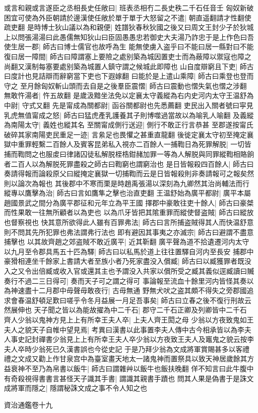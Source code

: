 或言和親或言遂臣之丞相長史任敞曰|{
	班表丞相冇二長史秩二千石任音壬}
匈奴新破困宜可使為外臣朝請於邊漢使任敞於單于單于大怒留之不遣|{
	朝直遥翻請才性翻使疏吏翻}
是時博士狄山議以為和親便|{
	姓譜狄春秋狄國之後又曰周文王封少子於狄城}
上以問張湯湯曰此愚儒無知狄山曰臣固愚愚忠若御史大夫湯乃詐忠于是上作色曰吾使生居一郡|{
	師古曰博士儒官也故呼為生}
能無使虜入盗乎曰不能曰居一縣對曰不能復曰居一障間|{
	師古曰障謂塞上要險之處别築為城因置吏士而為蔽障以禦寇也障之尚翻又漢制每塞要處别築為城置人鎮守謂之候城此即障也}
山自度辯窮且下吏|{
	師古曰度計也見詰辯而辭窮當下吏也下遐嫁翻}
曰能於是上遣山乘障|{
	師古曰乘登也登而守之}
至月餘匈奴斬山頭而去自是之後羣臣震慴|{
	師古曰震動也慴失氣也慴之涉翻}
無敢忤湯者|{
	忤五故翻}
是歲汲黯坐法免以定襄太守義縱為右内史河内太守王温舒為中尉|{
	守式又翻}
先是甯成為關都尉|{
	函谷關都尉也先悉薦翻}
吏民出入關者號曰寜見乳虎無值甯成之怒|{
	師古曰猛虎產乳護養其子則博噬過當故以為喻乳人喻翻}
及義縱為南陽太守|{
	義姓也縱其名}
至關甯成側行送迎|{
	側行不敢正行言恭甚}
至郡遂按甯氏破碎其家南陽吏民重足一迹|{
	言絫足也畏懼之甚重直龍翻}
後徙定襄太守初至掩定襄獄中重罪輕繫二百餘人及賓客昆弟私入視亦二百餘人一捕鞫日為死罪解脱|{
	一切皆捕而鞫問之也服䖍曰律諸囚徒私解脱桎梏鉗赭加罪一等為人解脱與同罪縱鞫相賂餉者二百人以為解脱死罪盡殺之師古曰鞫窮也謂窮治也}
是日皆報殺四百餘人|{
	師古曰奏請得報而論殺原父曰縱掩定襄獄一切捕鞫而云是日皆報殺則非奏請報可之報矣然則以論次為報也}
其後郡中不寒而栗是時趙禹張湯以深刻為九卿然其治尚輔法而行縱專以鷹擊為治|{
	師古曰言如鷹隼之擊也治直吏翻}
王温舒始為廣平都尉|{
	廣平本屬趙國景武之間分為廣平郡征和元年立為平王國}
擇郡中豪敢往吏十餘人|{
	師古曰豪桀而性果敢一往無所顧者以為吏也}
以為爪牙皆把其隂重罪而縱使督盗賊|{
	師古曰縱放也督察視也}
快其意所欲得此人雖有百罪弗法|{
	師古曰言所捕盗賊得其人而快温舒意則不問其先所犯罪也弗法謂弗行法也}
即有避因其事夷之亦滅宗|{
	師古曰避謂不盡意捕擊也}
以其故齊趙之郊盗賊不敢近廣平|{
	近其靳翻}
廣平聲為道不拾遺遷河内太守以九月至令郡具馬五十匹為驛|{
	師古曰以私馬於道上往往置驛自河内至長安}
捕郡中豪猾相連坐千餘家上書請大者至族小者乃死家盡没入償臧|{
	師古曰以臧獲罪者既没入之又令出倍臧或收入官或還其主也予謂没入共家以償所受之臧其義似逕臧讀曰贓}
奏行不過二三日得可|{
	奏而天子可之謂之得可}
事論報至流血十餘里河内皆怪其奏以為神速盡十二月郡中毋聲毋敢夜行|{
	古毋無通}
野無犬吠之盗其頗不得失之旁郡國追求會春温舒頓足歎曰嗟乎令冬月益展一月足吾事矣|{
	師古曰立春之後不復行刑故云然展伸也}
天子聞之皆以為能故擢為中二千石|{
	郡守二千石正卿及列卿皆中二千石}
齊人少翁以鬼神方見上上有所幸王夫人卒|{
	上夫人齊王閎之母}
少翁以方夜致鬼如王夫人之貌天子自帷中望見焉|{
	考異曰漢書以此事置李夫人傳中古今相承皆以為李夫人事史記封禪書少翁見上上有所幸王夫人卒少翁以方夜致王夫人及竈鬼之貌云按李夫人卒時少翁死已久漢書誤也今從史記}
于是乃拜少翁為文成將軍賞賜甚多以客禮禮之文成又勸上作甘泉宫中為臺室畫天地太一諸鬼神而置祭具以致天神居歲餘其方益衰神不至乃為帛書以飯牛|{
	師古曰謂雜艸以飯牛也飯扶晚翻}
佯不知言曰此牛腹中有奇殺視得書書言甚怪天子識其手書|{
	謂識其親書手蹟也}
問其人果是偽書于是誅文成將軍而隱之|{
	隱謂秘誅文成之事不令人知之也}


資治通鑑卷十九
